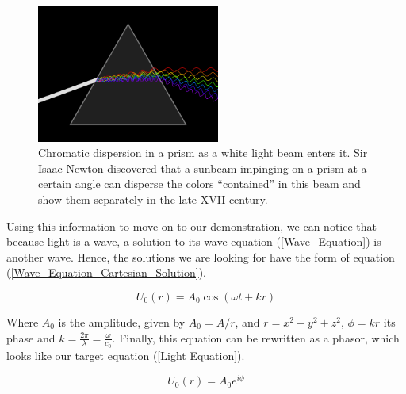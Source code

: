 \begin{figure}[htbp]
    \centering
    \includegraphics[width=6cm]{images/c02/EM Waves/Prism.PNG}
    \caption{Chromatic dispersion in a prism as a white light beam enters it. Sir Isaac Newton discovered that a sunbeam impinging on a prism at a certain angle can disperse the colors ``contained'' in this beam and show them separately in the late XVII century.}
    \label{fig:Prism}
\end{figure}


Using this information to move on to our demonstration, we can notice that because light is a wave, a solution to its wave equation (\ref{Wave_Equation}) is another wave. Hence, the solutions we are looking for have the form of equation (\ref{Wave_Equation_Cartesian_Solution}).


\begin{equation}
    U_0(r) = A_0\cos(\omega t + kr)
    \label{Wave_Equation_Cartesian_Solution}
\end{equation}

Where $A_0$ is the amplitude, given by $A_0 = A/r$, and $r = x^2 + y^2 + z^2$, $\phi = kr$ its phase and $k = \frac{2\pi}{\lambda} = \frac{\omega}{c_0}$. Finally, this equation can be rewritten as a phasor, which looks like our target equation (\ref{Light Equation}).

\begin{equation}
    U_0(r) = A_0e^{i\phi}
\end{equation}

